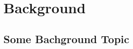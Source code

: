 \chapter{Background}\label{\positionnumber} 

\section{Some Bachground Topic}\label{\positionnumber}
